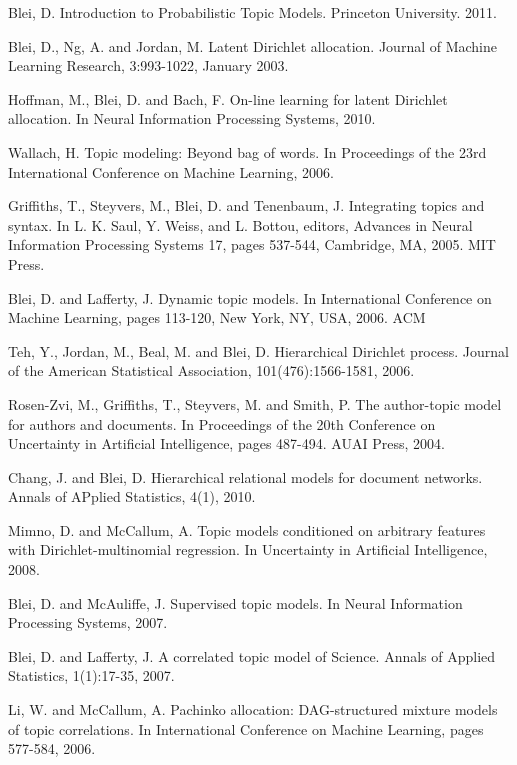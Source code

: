\documentclass[conference]{IEEEtran}
\begin{document}
\begin{thebibliography}{1}

Blei, D. Introduction to Probabilistic Topic Models. Princeton University. 2011.

Blei, D., Ng, A. and Jordan, M. Latent Dirichlet allocation. Journal of Machine Learning Research, 3:993-1022, January 2003.

Hoffman, M., Blei, D. and Bach, F. On-line learning for latent Dirichlet allocation. In Neural Information Processing Systems, 2010.

Wallach, H. Topic modeling: Beyond bag of words. In Proceedings of the 23rd International Conference on Machine Learning, 2006.

Griffiths, T., Steyvers, M., Blei, D. and Tenenbaum, J. Integrating topics and syntax. In L. K. Saul, Y. Weiss, and L. Bottou, editors, Advances in Neural Information Processing Systems 17, pages 537-544, Cambridge, MA, 2005. MIT Press.

Blei, D. and Lafferty, J. Dynamic topic models. In International Conference on Machine Learning, pages 113-120, New York, NY, USA, 2006. ACM

Teh, Y., Jordan, M., Beal, M. and Blei, D. Hierarchical Dirichlet process. Journal of the American Statistical Association, 101(476):1566-1581, 2006.

Rosen-Zvi, M., Griffiths, T., Steyvers, M. and Smith, P. The author-topic model for authors and documents. In Proceedings of the 20th Conference on Uncertainty in Artificial Intelligence, pages 487-494. AUAI Press, 2004.

Chang, J. and Blei, D. Hierarchical relational models for document networks. Annals of APplied Statistics, 4(1), 2010.

Mimno, D. and McCallum, A. Topic models conditioned on arbitrary features with Dirichlet-multinomial regression. In Uncertainty in Artificial Intelligence, 2008.

Blei, D. and McAuliffe, J. Supervised topic models. In Neural Information Processing Systems, 2007.

Blei, D. and Lafferty, J. A correlated topic model of Science. Annals of Applied Statistics, 1(1):17-35, 2007.

Li, W. and McCallum, A. Pachinko allocation: DAG-structured mixture models of topic correlations. In International Conference on Machine Learning, pages 577-584, 2006.


\end{thebibliography}
\end{document}
